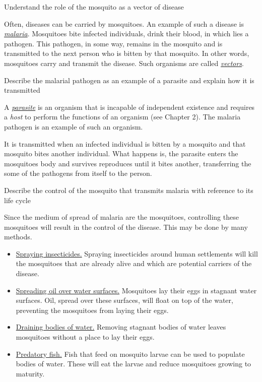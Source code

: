 \begin{point}
Understand the role of the mosquito as a vector of disease
\end{point}

Often, diseases can be carried by mosquitoes. An example of such a disease is 
\ul{\emph{malaria}}. Mosquitoes bite infected individuals, drink their blood, in which lies
a pathogen. This pathogen, in some way, remains in the mosquito and is transmitted to the next
person who is bitten by that mosquito. In other words, mosquitoes carry and transmit the disease.
Such organisms are called \ul{\emph{vectors}}.

\begin{point}
Describe the malarial pathogen as an example of a parasite and explain how it is transmitted
\end{point}

A \ul{\emph{parasite}} is an organism that is incapable of independent existence and 
requires a \emph{host} to perform the functions of an organism (see Chapter 2). The malaria
pathogen is an example of such an organism. 

It is transmitted when an infected individual is bitten by a mosquito and that mosquito bites
another individual. What happens is, the parasite enters the mosquitoes body and survives
reproduces until it bites another, transferring the some of the 
pathogens from itself to the person.

\begin{point}
Describe the control of the mosquito that transmits malaria with reference to its life cycle
\end{point}

Since the medium of spread of malaria are the mosquitoes, controlling these mosquitoes will
result in the control of the disease. This may be done by many methods.

\begin{itemize}[]
\item\ul{Spraying insecticides.} Spraying insecticides around human settlements will kill
the mosquitoes that are already alive and which are potential carriers of the disease.

\item\ul{Spreading oil over water surfaces.} Mosquitoes lay their eggs in stagnant water
surfaces. Oil, spread over these surfaces, will float on top of the water, preventing the 
mosquitoes from laying their eggs.

\item\ul{Draining bodies of water.} Removing stagnant bodies of water leaves mosquitoes without
a place to lay their eggs.

\item\ul{Predatory fish.} Fish that feed on mosquito larvae can be used to populate bodies of
water. These will eat the larvae and reduce mosquitoes growing to maturity.
\end{itemize}

